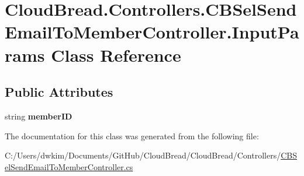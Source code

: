 \hypertarget{a00104}{}\section{Cloud\+Bread.\+Controllers.\+C\+B\+Sel\+Send\+Email\+To\+Member\+Controller.\+Input\+Params Class Reference}
\label{a00104}
\subsection*{Public Attributes}
\begin{DoxyCompactItemize}
\item 
string {\bfseries member\+ID}\hypertarget{a00104_a72817037da0ca32e00422872fd83da04}{}\label{a00104_a72817037da0ca32e00422872fd83da04}

\end{DoxyCompactItemize}


The documentation for this class was generated from the following file\+:\begin{DoxyCompactItemize}
\item 
C\+:/\+Users/dwkim/\+Documents/\+Git\+Hub/\+Cloud\+Bread/\+Cloud\+Bread/\+Controllers/\hyperlink{a00226}{C\+B\+Sel\+Send\+Email\+To\+Member\+Controller.\+cs}\end{DoxyCompactItemize}
